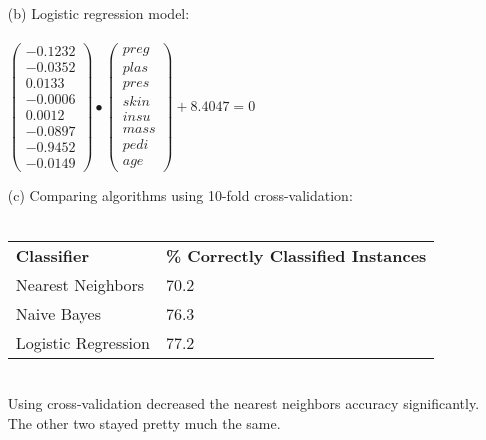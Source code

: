 \documentclass[12pt]{article}
\begin{document}
\begin{enumerate}
\begin{enumerate}
  	\item[(b)] Logistic regression model: \\ \\
	  	\begin{math}
			\left(
	  			\begin{array}{r}
	  				-0.1232 \\
	  				-0.0352 \\
	  				0.0133 \\
	  				-0.0006 \\
	  				0.0012 \\
	  				-0.0897 \\
	  				-0.9452 \\
	  				-0.0149 
	  			\end{array}  		
	  		\right)
	  		\bullet
	  		\left(
	  			\begin{array}{r}
	  				preg \\
	  				plas \\
	  				pres \\
	  				skin \\
	  				insu \\
	  				mass \\
	  				pedi \\
	  				age 
	  			\end{array}
	  		\right)
	  		+ 8.4047 = 0	  		
	  	\end{math} \\
	\item[(c)] Comparing algorithms using 10-fold cross-validation: \\ \\
  		\begin{tabular}{l l}
  			\textbf{Classifier} & \textbf{\% Correctly Classified Instances} \\
  			Nearest Neighbors & 70.2 \\
  			Naive Bayes & 76.3 \\
  			Logistic Regression & 77.2
  		\end{tabular} \\
  		
  		Using cross-validation decreased the nearest neighbors accuracy significantly. The other two stayed pretty much the same. 
  		

\end{enumerate}
\end{enumerate}
\end{document}
